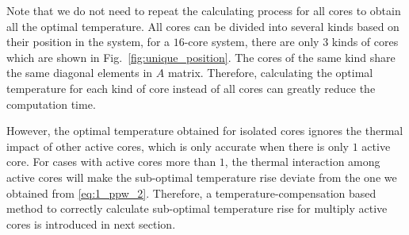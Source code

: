 Note that we do not need to repeat the calculating process for all cores to obtain all the optimal temperature. All cores can be divided into several kinds based on their position in the system, for a $16$-core system, there are only $3$ kinds of cores which are shown in Fig.~\ref{fig:unique_position}. The cores of the same kind share the same diagonal elements in $A$ matrix. Therefore, calculating the optimal temperature for each kind of core instead of all cores can greatly reduce the computation time.

However, the optimal temperature obtained for isolated cores ignores the thermal impact of other active cores, which is only accurate when there is only $1$ active core. For cases with active cores more than $1$, the thermal interaction among active cores will make the sub-optimal temperature rise deviate from the one we obtained from \eqref{eq:1_ppw_2}. Therefore, a temperature-compensation based method to correctly calculate sub-optimal temperature rise for multiply active cores is introduced in next section.

